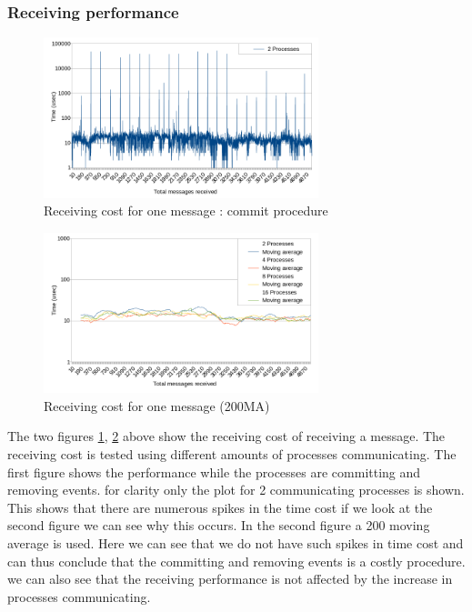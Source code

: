 \documentclass[twocolumn, a4paper,11pt]{article}%
\begin{document}
\subsubsection{Receiving performance}
\begin{figure}[h]
	\includegraphics[width=8cm]{recv_timing_commit_2_processes_new.png}
	\caption{Receiving cost for one message : commit procedure}
	\label{fig:comm_recv}
\end{figure}
\begin{figure}[h]
	\includegraphics[width=8cm]{recv_timing_nocommit_ma_new.png}
	\caption{Receiving cost for one message (200MA)}
	\label{fig:nocomm_recv}
\end{figure}\noindent
The two figures \ref{fig:comm_recv}, \ref{fig:nocomm_recv} above show the receiving cost of receiving a message. The receiving cost is tested using different amounts of processes communicating. The first figure shows the performance while the processes are committing and removing events. for clarity only the plot for 2 communicating processes is shown. This shows that there are numerous spikes in the time cost if we look at the second figure we can see why this occurs. In the second figure a 200 moving average is used. Here we can see that we do not have such spikes in time cost and can thus conclude that the committing and removing events is a costly procedure. we can also see that the receiving performance is not affected by the increase in processes communicating.
\end{document}
